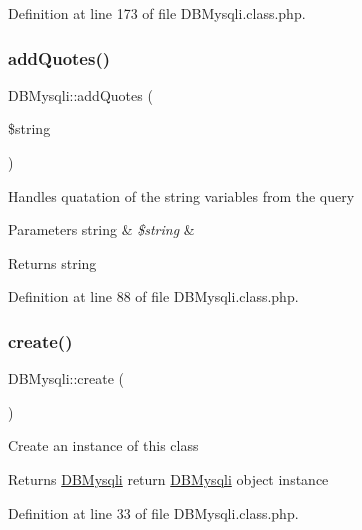 Definition at line 173 of file D\+B\+Mysqli.\+class.\+php.

\hypertarget{classDBMysqli_a29266a97d63be11763eb24926d39f544}{}\label{classDBMysqli_a29266a97d63be11763eb24926d39f544} 
\subsubsection{\texorpdfstring{add\+Quotes()}{addQuotes()}}
{\footnotesize\ttfamily D\+B\+Mysqli\+::add\+Quotes (\begin{DoxyParamCaption}\item[{}]{\$string }\end{DoxyParamCaption})}

Handles quatation of the string variables from the query 
\begin{DoxyParams}[1]{Parameters}
string & {\em \$string} & \\
\hline
\end{DoxyParams}
\begin{DoxyReturn}{Returns}
string 
\end{DoxyReturn}


Definition at line 88 of file D\+B\+Mysqli.\+class.\+php.

\hypertarget{classDBMysqli_a589dd45054eb50e666c3a57815631111}{}\label{classDBMysqli_a589dd45054eb50e666c3a57815631111} 
\subsubsection{\texorpdfstring{create()}{create()}}
{\footnotesize\ttfamily D\+B\+Mysqli\+::create (\begin{DoxyParamCaption}{ }\end{DoxyParamCaption})}

Create an instance of this class \begin{DoxyReturn}{Returns}
\hyperlink{classDBMysqli}{D\+B\+Mysqli} return \hyperlink{classDBMysqli}{D\+B\+Mysqli} object instance 
\end{DoxyReturn}


Definition at line 33 of file D\+B\+Mysqli.\+class.\+php.

\hypertarget{classDBMysqli_a9e173fea0afa5c419977be95d1859892}{}\label{classDBMysqli_a9e173fea0afa5c419977be95d1859892} 
